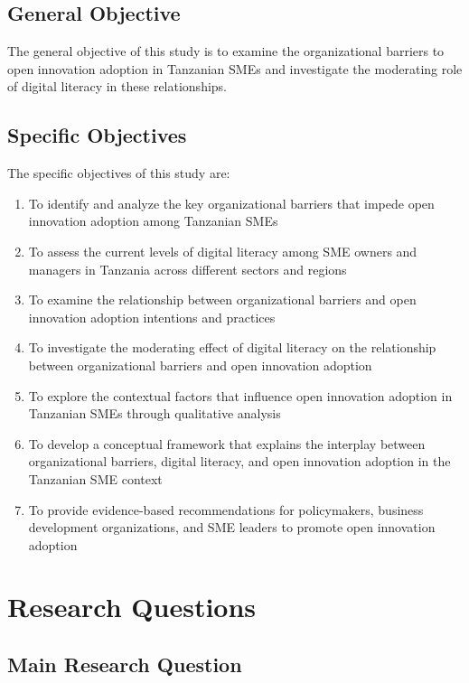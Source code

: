 \documentclass[12pt,a4paper]{article}
\begin{document}
\subsection{General Objective}

The general objective of this study is to examine the organizational barriers to open innovation adoption in Tanzanian SMEs and investigate the moderating role of digital literacy in these relationships.

\subsection{Specific Objectives}

The specific objectives of this study are:

\begin{enumerate}
\item To identify and analyze the key organizational barriers that impede open innovation adoption among Tanzanian SMEs
\item To assess the current levels of digital literacy among SME owners and managers in Tanzania across different sectors and regions
\item To examine the relationship between organizational barriers and open innovation adoption intentions and practices
\item To investigate the moderating effect of digital literacy on the relationship between organizational barriers and open innovation adoption
\item To explore the contextual factors that influence open innovation adoption in Tanzanian SMEs through qualitative analysis
\item To develop a conceptual framework that explains the interplay between organizational barriers, digital literacy, and open innovation adoption in the Tanzanian SME context
\item To provide evidence-based recommendations for policymakers, business development organizations, and SME leaders to promote open innovation adoption
\end{enumerate}

\section{Research Questions}

\subsection{Main Research Question}
\end{document}
